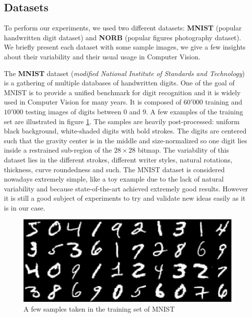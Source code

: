 \documentclass[a4paper,12pt]{report}
\begin{document}
\subsection{Datasets}
To perform our experiments, we used two different datasets: {\bf MNIST}\cite{lecun1998mnist} (popular handwritten digit dataset) and {\bf NORB}\cite{lecun2004learning} (popular figures photography dataset).
We briefly present each dataset with some sample images, we give a few insights about their variability and their usual usage in Computer Vision.

The {\bf MNIST} dataset ({\em modified National Institute of Standards and Technology}) is a gathering of multiple databases of handwritten digits.
One of the goal of MNIST is to provide a unified benchmark for digit recognition and it is widely used in Computer Vision for many years.
It is composed of $60'000$ training and $10'000$ testing images of digits between $0$ and $9$.
A few examples of the training set are illustrated in figure \ref{fig:mnist}.
The samples are heavily post-processed: uniform black background, white-shaded digits with bold strokes.
The digits are centered such that the gravity center is in the middle and size-normalized so one digit lies inside a restrained sub-region of the $28 \times 28$ bitmap.
The variability of this dataset lies in the different strokes, different writer styles, natural rotations, thickness, curve roundedness and such.
The MNIST dataset is considered nowadays extremely simple, like a toy example due to the lack of natural variability and because state-of-the-art achieved extremely good results.
However it is still a good subject of experiments to try and validate new ideas easily as it is in our case.

\begin{figure}[h]
    \begin{center}
        \includegraphics{thesis_figures/mnist.jpg}
    \end{center}
    \caption{A few samples taken in the training set of MNIST}
    \label{fig:mnist}
\end{figure}
\end{document}
